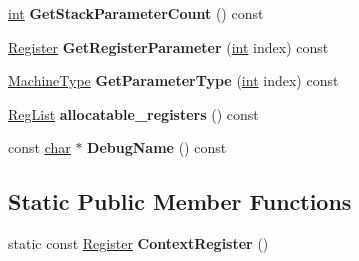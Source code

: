 \begin{DoxyCompactItemize}
\mbox{\hyperlink{classint}{int}} {\bfseries Get\+Stack\+Parameter\+Count} () const
\item 
\mbox{\label{classv8_1_1internal_1_1CallInterfaceDescriptor_a5bdb58373c195ea0feaaa43f35f06c75}} 
\mbox{\hyperlink{classv8_1_1internal_1_1Register}{Register}} {\bfseries Get\+Register\+Parameter} (\mbox{\hyperlink{classint}{int}} index) const
\item 
\mbox{\label{classv8_1_1internal_1_1CallInterfaceDescriptor_ae63d4681edad5ffc24b737eb8f1a341c}} 
\mbox{\hyperlink{classv8_1_1internal_1_1MachineType}{Machine\+Type}} {\bfseries Get\+Parameter\+Type} (\mbox{\hyperlink{classint}{int}} index) const
\item 
\mbox{\label{classv8_1_1internal_1_1CallInterfaceDescriptor_a20b0de24ec738605b37e414b8c63e86b}} 
\mbox{\hyperlink{classuint32__t}{Reg\+List}} {\bfseries allocatable\+\_\+registers} () const
\item 
\mbox{\label{classv8_1_1internal_1_1CallInterfaceDescriptor_a07ed8b51d804c824c8a96517b4806684}} 
const \mbox{\hyperlink{classchar}{char}} $\ast$ {\bfseries Debug\+Name} () const
\end{DoxyCompactItemize}
\subsection*{Static Public Member Functions}
\begin{DoxyCompactItemize}
\item 
\mbox{\label{classv8_1_1internal_1_1CallInterfaceDescriptor_abb2de6679e85ede9b8e8d8b0ca105f98}} 
static const \mbox{\hyperlink{classv8_1_1internal_1_1Register}{Register}} {\bfseries Context\+Register} ()
\end{DoxyCompactItemize}

